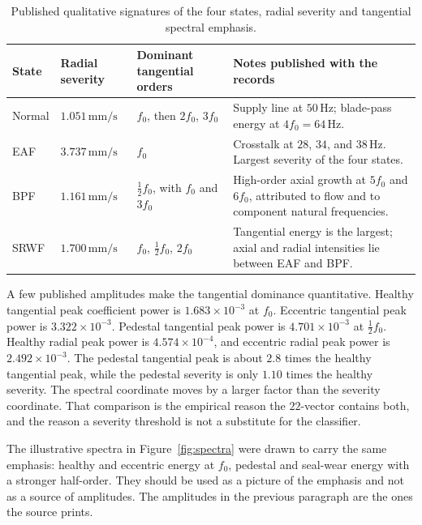 \begin{table}[H]
\centering
\caption{Published qualitative signatures of the four states, radial severity and tangential spectral emphasis.}
\label{tab:sign}
\small
\begin{tabular}{p{2.4cm}p{2.3cm}p{3.6cm}p{4.6cm}}
\toprule
State & Radial severity & Dominant tangential orders & Notes published with the records \\
\midrule
Normal & \(1.051\,\mathrm{mm/s}\) & \(f_{0}\), then \(2f_{0}\), \(3f_{0}\) & Supply line at \(50\,\mathrm{Hz}\); blade-pass energy at \(4f_{0}=64\,\mathrm{Hz}\). \\
EAF & \(3.737\,\mathrm{mm/s}\) & \(f_{0}\) & Crosstalk at \(28\), \(34\), and \(38\,\mathrm{Hz}\). Largest severity of the four states. \\
BPF & \(1.161\,\mathrm{mm/s}\) & \(\tfrac12 f_{0}\), with \(f_{0}\) and \(3f_{0}\) & High-order axial growth at \(5f_{0}\) and \(6f_{0}\), attributed to flow and to component natural frequencies. \\
SRWF & \(1.700\,\mathrm{mm/s}\) & \(f_{0}\), \(\tfrac12 f_{0}\), \(2f_{0}\) & Tangential energy is the largest; axial and radial intensities lie between EAF and BPF. \\
\bottomrule
\end{tabular}
\end{table}

A few published amplitudes make the tangential dominance quantitative.
Healthy tangential peak coefficient power is \(1.683\times 10^{-3}\) at \(f_{0}\).
Eccentric tangential peak power is \(3.322\times 10^{-3}\).
Pedestal tangential peak power is \(4.701\times 10^{-3}\) at \(\tfrac12 f_{0}\).
Healthy radial peak power is \(4.574\times 10^{-4}\), and eccentric radial peak power is \(2.492\times 10^{-3}\).
The pedestal tangential peak is about \(2.8\) times the healthy tangential peak, while the pedestal severity is only \(1.10\) times the healthy severity.
The spectral coordinate moves by a larger factor than the severity coordinate.
That comparison is the empirical reason the \(22\)-vector contains both, and the reason a severity threshold is not a substitute for the classifier.

The illustrative spectra in Figure~\ref{fig:spectra} were drawn to carry the same emphasis: healthy and eccentric energy at \(f_{0}\), pedestal and seal-wear energy with a stronger half-order.
They should be used as a picture of the emphasis and not as a source of amplitudes.
The amplitudes in the previous paragraph are the ones the source prints.

